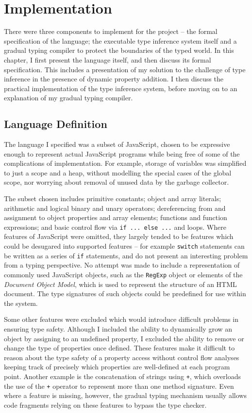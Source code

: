 \documentclass[12pt,a4paper,twoside,openright]{report}
\theoremstyle{definition}
\theoremstyle{dotless}
\newcommand*{\js}{\texttt}
\begin{document}
\chapter{Implementation}\label{implementation}

There were three components to implement for the project -- the formal
specification of the language; the executable type inference system itself and
a gradual typing compiler to protect the boundaries of the typed world. 
In this chapter, I first present the language itself, and then discuss
its formal specification. This includes a presentation of my solution to
the challenge of type inference in the presence of dynamic property addition.
I then discuss the practical implementation of the type inference system, 
before moving on to an explanation of my gradual typing compiler.

\section{Language Definition}

The language I specified was a subset of JavaScript, chosen to be expressive
enough to represent actual JavaScript programs while being free of some of the
complications of implementation. For example, storage of variables was
simplified to just a scope and a heap, without modelling the special cases of
the global scope, nor worrying about removal of unused data by the garbage
collector. 

The subset chosen includes primitive constants; object and array literals;
arithmetic and logical binary and unary operators; dereferencing from and
assignment to object properties and array elements; functions and function expressions; and basic control flow via \js{if ... else ...} and loops.  
Where features of JavaScript were omitted, they largely tended to be features
which could be desugared into supported features -- for example \js{switch}
statements can be written as a series of \js{if} statements, and do not present
an interesting problem from a typing perspective. No attempt was made to
include a representation of commonly used JavaScript objects, such as the
\js{RegExp} object or elements of the \textit{Document Object Model}, which is used to
represent the structure of an HTML document. The type signatures of such objects
could be predefined for use within the system.

Some other features were excluded which would introduce difficult problems in
ensuring type safety.  Although I included the ability to dynamically grow an
object by assigning to an undefined property, I excluded the ability to remove
or change the type of properties once defined. These features
make it difficult to reason about the type safety of a property
access without control flow analyses keeping track of precisely which
properties are well-defined at each program point. Another example is the
concatenation of strings using \js{+}, which overloads the use of the \js{+}
operator to represent more than one method signature. Even where a feature is
missing, however, the gradual typing mechanism usually allows code fragments
relying on these features to bypass the type checker. 
\end{document}
